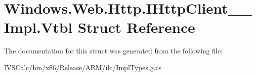 \hypertarget{struct_windows_1_1_web_1_1_http_1_1_i_http_client_____impl_1_1_vtbl}{}\section{Windows.\+Web.\+Http.\+I\+Http\+Client\+\_\+\+\_\+\+Impl.\+Vtbl Struct Reference}
\label{struct_windows_1_1_web_1_1_http_1_1_i_http_client_____impl_1_1_vtbl}


The documentation for this struct was generated from the following file\+:\begin{DoxyCompactItemize}
\item 
I\+V\+S\+Calc/bin/x86/\+Release/\+A\+R\+M/ilc/Impl\+Types.\+g.\+cs\end{DoxyCompactItemize}
